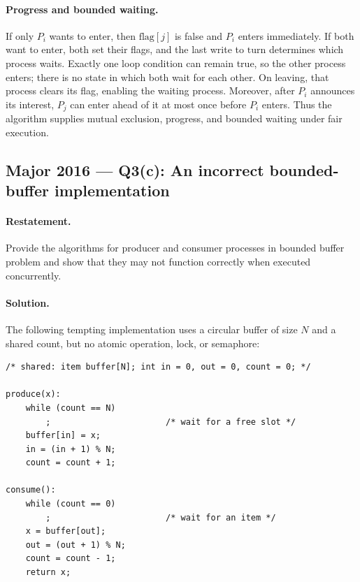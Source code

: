 \documentclass[11pt,a4paper]{article}
\begin{document}
\paragraph{Progress and bounded waiting.}
If only \(P_i\) wants to enter, then \(\mathrm{flag}[j]\) is false and
\(P_i\) enters immediately.  If both want to enter, both set their
flags, and the last write to \(\mathrm{turn}\) determines which process
waits.  Exactly one loop condition can remain true, so the other
process enters; there is no state in which both wait for each other.
On leaving, that process clears its flag, enabling the waiting process.
Moreover, after \(P_i\) announces its interest, \(P_j\) can enter ahead
of it at most once before \(P_i\) enters.  Thus the algorithm supplies
mutual exclusion, progress, and bounded waiting under fair execution.

\subsection*{Major 2016 --- Q3(c): An incorrect bounded-buffer implementation}

\paragraph{Restatement.}
Provide the algorithms for producer and consumer processes in bounded
buffer problem and show that they may not function correctly when
executed concurrently.

\paragraph{Solution.}
The following tempting implementation uses a circular buffer of size
\(N\) and a shared count, but no atomic operation, lock, or semaphore:

\begin{verbatim}
/* shared: item buffer[N]; int in = 0, out = 0, count = 0; */

produce(x):
    while (count == N)
        ;                       /* wait for a free slot */
    buffer[in] = x;
    in = (in + 1) % N;
    count = count + 1;

consume():
    while (count == 0)
        ;                       /* wait for an item */
    x = buffer[out];
    out = (out + 1) % N;
    count = count - 1;
    return x;
\end{verbatim}
\end{document}
